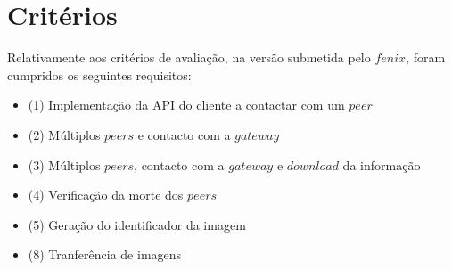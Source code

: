 \documentclass[a4paper, 12pt]{article}
\begin{document}
\newpage
\section{Critérios}
 Relativamente aos critérios de avaliação, na versão submetida pelo $fenix$, foram cumpridos os seguintes requisitos:
 \begin{itemize}
 \item (1) Implementação da API do cliente a contactar com um $peer$
 \item (2) Múltiplos $peers$ e contacto com a $gateway$
 \item (3) Múltiplos $peers$, contacto com a $gateway$ e $download$ da informação
 \item (4) Verificação da morte dos $peers$
 \item (5) Geração do identificador da imagem
 \item (8) Tranferência de imagens
 \end{itemize}
\end{document}
